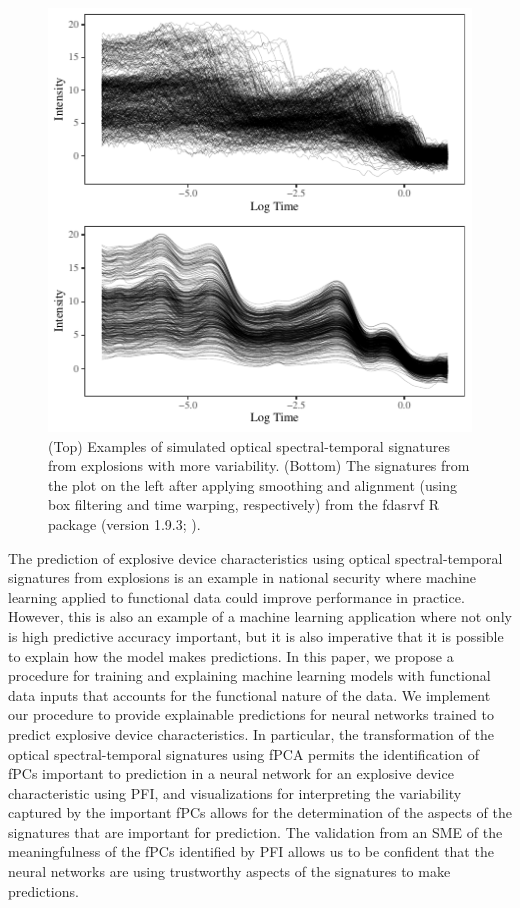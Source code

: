\documentclass[letterpaper]{article}
\begin{document}
\begin{figure}[t]
\centering
\includegraphics[width=.95\columnwidth]{fig7}
\caption{(Top) Examples of simulated optical spectral-temporal signatures from explosions with more variability. (Bottom) The signatures from the plot on the left after applying smoothing and alignment (using box filtering and time warping, respectively) from the fdasrvf R package (version 1.9.3; \citeauthor{tucker:2020} \citeyear{tucker:2020}).}
\label{fig7}
\end{figure}

The prediction of explosive device characteristics using optical spectral-temporal signatures from explosions is an example in national security where machine learning applied to functional data could improve performance in practice. However, this is also an example of a machine learning application where not only is high predictive accuracy important, but it is also imperative that it is possible to explain how the model makes predictions. In this paper, we propose a procedure for training and explaining machine learning models with functional data inputs that accounts for the functional nature of the data. We implement our procedure to provide explainable predictions for neural networks trained to predict explosive device characteristics. In particular, the transformation of the optical spectral-temporal signatures using fPCA permits the identification of fPCs important to prediction in a neural network for an explosive device characteristic using PFI, and visualizations for interpreting the variability captured by the important fPCs allows for the determination of the aspects of the signatures that are important for prediction. The validation from an SME of the meaningfulness of the fPCs identified by PFI allows us to be confident that the neural networks are using trustworthy aspects of the signatures to make predictions.
\end{document}
